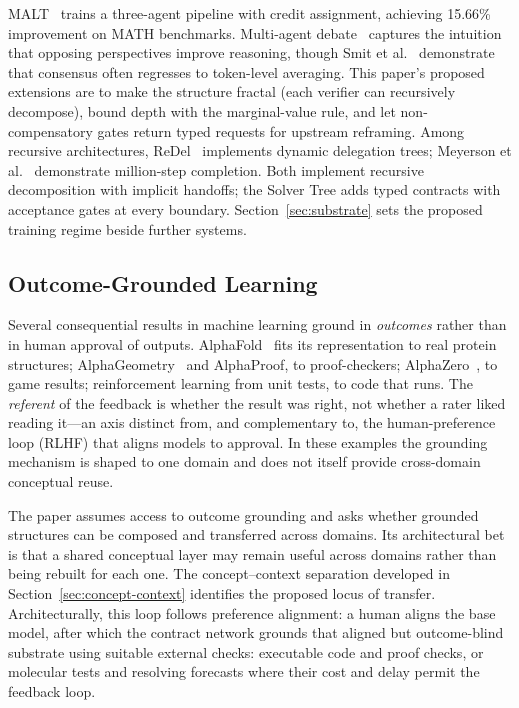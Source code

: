 \documentclass[11pt]{article}
\begin{document}
MALT~\cite{MALT2024} trains a three-agent pipeline with credit assignment, achieving 15.66\% improvement on MATH benchmarks. Multi-agent debate~\cite{du2024multiagent,liang2024mad} captures the intuition that opposing perspectives improve reasoning, though Smit et al.~\cite{smit2024mad} demonstrate that consensus often regresses to token-level averaging. This paper's proposed extensions are to make the structure fractal (each verifier can recursively decompose), bound depth with the marginal-value rule, and let non-compensatory gates return typed requests for upstream reframing. Among recursive architectures, ReDel~\cite{Zhu2024} implements dynamic delegation trees; Meyerson et al.~\cite{meyerson2025maker} demonstrate million-step completion. Both implement recursive decomposition with implicit handoffs; the Solver Tree adds typed contracts with acceptance gates at every boundary. Section~\ref{sec:substrate} sets the proposed training regime beside further systems.

\subsection{Outcome-Grounded Learning}

Several consequential results in machine learning ground in \emph{outcomes} rather than in human approval of outputs. AlphaFold~\cite{jumper2021alphafold} fits its representation to real protein structures; AlphaGeometry~\cite{trinh2024alphageometry} and AlphaProof, to proof-checkers; AlphaZero~\cite{silver2018alphazero}, to game results; reinforcement learning from unit tests, to code that runs. The \emph{referent} of the feedback is whether the result was right, not whether a rater liked reading it---an axis distinct from, and complementary to, the human-preference loop (RLHF) that aligns models to approval. In these examples the grounding mechanism is shaped to one domain and does not itself provide cross-domain conceptual reuse.

The paper assumes access to outcome grounding and asks whether grounded structures can be composed and transferred across domains. Its architectural bet is that a shared conceptual layer may remain useful across domains rather than being rebuilt for each one. The concept--context separation developed in Section~\ref{sec:concept-context} identifies the proposed locus of transfer. Architecturally, this loop follows preference alignment: a human aligns the base model, after which the contract network grounds that aligned but outcome-blind substrate using suitable external checks: executable code and proof checks, or molecular tests and resolving forecasts where their cost and delay permit the feedback loop.
\end{document}
